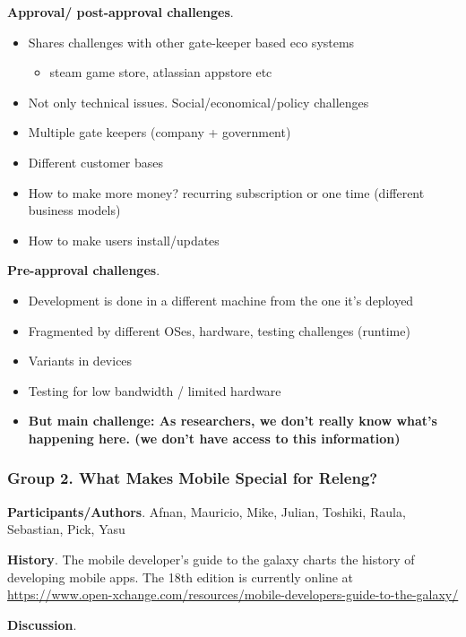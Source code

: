 \documentclass[a4paper]{article}
\newcommand{\smallsection}[1]{\noindent \textbf{#1}. }
\begin{document}
\smallsection{Approval/ post-approval challenges}

\begin{itemize}
\tightlist
\item
  Shares challenges with other gate-keeper based eco systems

  \begin{itemize}
  \tightlist
  \item
    steam game store, atlassian appstore etc
  \end{itemize}
\item
  Not only technical issues. Social/economical/policy challenges
\item
  Multiple gate keepers (company + government)
\item
  Different customer bases
\item
  How to make more money? recurring subscription or one time (different
  business models)
\item
  How to make users install/updates
\end{itemize}

\smallsection{Pre-approval challenges}

\begin{itemize}
\tightlist
\item
  Development is done in a different machine from the one it's deployed
\item
  Fragmented by different OSes, hardware, testing challenges (runtime)
\item
  Variants in devices
\item
  Testing for low bandwidth / limited hardware
\item
  \textbf{But main challenge: As researchers, we don't really know
  what's happening here. (we don't have access to this information)}
\end{itemize}

\subsubsection{Group 2. What Makes Mobile Special for Releng?}
\smallsection{Participants/Authors}
Afnan, Mauricio, Mike, Julian, Toshiki, Raula, Sebastian, Pick, Yasu

\smallsection{History}
The mobile developer's guide to the galaxy charts the history of
developing mobile apps. The 18th edition is currently online at \url{https://www.open-xchange.com/resources/mobile-developers-guide-to-the-galaxy/}

\smallsection{Discussion}\label{discussion}
\end{document}
